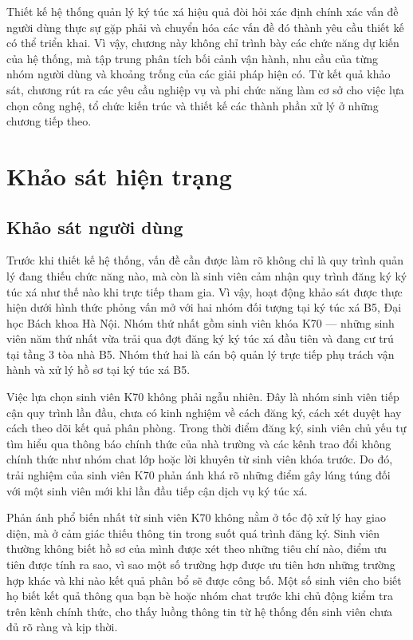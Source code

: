 \documentclass[../DoAn.tex]{subfiles}
\begin{document}
\sloppy

Thiết kế hệ thống quản lý ký túc xá hiệu quả đòi hỏi xác định chính xác vấn đề người dùng thực sự gặp phải và chuyển hóa các vấn đề đó thành yêu cầu thiết kế có thể triển khai. Vì vậy, chương này không chỉ trình bày các chức năng dự kiến của hệ thống, mà tập trung phân tích bối cảnh vận hành, nhu cầu của từng nhóm người dùng và khoảng trống của các giải pháp hiện có. Từ kết quả khảo sát, chương rút ra các yêu cầu nghiệp vụ và phi chức năng làm cơ sở cho việc lựa chọn công nghệ, tổ chức kiến trúc và thiết kế các thành phần xử lý ở những chương tiếp theo.

\section{Khảo sát hiện trạng}
\label{sec:survey}

\subsection{Khảo sát người dùng}

Trước khi thiết kế hệ thống, vấn đề cần được làm rõ không chỉ là quy trình quản lý đang thiếu chức năng nào, mà còn là sinh viên cảm nhận quy trình đăng ký ký túc xá như thế nào khi trực tiếp tham gia. Vì vậy, hoạt động khảo sát được thực hiện dưới hình thức phỏng vấn mở với hai nhóm đối tượng tại ký túc xá B5, Đại học Bách khoa Hà Nội. Nhóm thứ nhất gồm sinh viên khóa K70 --- những sinh viên năm thứ nhất vừa trải qua đợt đăng ký ký túc xá đầu tiên và đang cư trú tại tầng 3 tòa nhà B5. Nhóm thứ hai là cán bộ quản lý trực tiếp phụ trách vận hành và xử lý hồ sơ tại ký túc xá B5.

Việc lựa chọn sinh viên K70 không phải ngẫu nhiên. Đây là nhóm sinh viên tiếp cận quy trình lần đầu, chưa có kinh nghiệm về cách đăng ký, cách xét duyệt hay cách theo dõi kết quả phân phòng. Trong thời điểm đăng ký, sinh viên chủ yếu tự tìm hiểu qua thông báo chính thức của nhà trường và các kênh trao đổi không chính thức như nhóm chat lớp hoặc lời khuyên từ sinh viên khóa trước. Do đó, trải nghiệm của sinh viên K70 phản ánh khá rõ những điểm gây lúng túng đối với một sinh viên mới khi lần đầu tiếp cận dịch vụ ký túc xá.

Phản ánh phổ biến nhất từ sinh viên K70 không nằm ở tốc độ xử lý hay giao diện, mà ở cảm giác thiếu thông tin trong suốt quá trình đăng ký. Sinh viên thường không biết hồ sơ của mình được xét theo những tiêu chí nào, điểm ưu tiên được tính ra sao, vì sao một số trường hợp được ưu tiên hơn những trường hợp khác và khi nào kết quả phân bổ sẽ được công bố. Một số sinh viên cho biết họ biết kết quả thông qua bạn bè hoặc nhóm chat trước khi chủ động kiểm tra trên kênh chính thức, cho thấy luồng thông tin từ hệ thống đến sinh viên chưa đủ rõ ràng và kịp thời.
\end{document}
